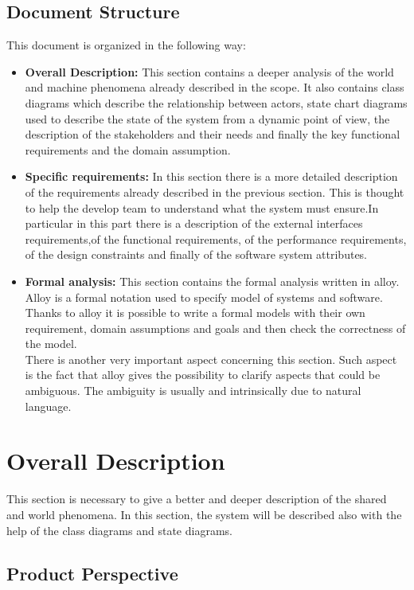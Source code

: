 \documentclass[titlepage]{article}
\begin{document}
\subsection{Document Structure}
This document is organized in the following way:
\begin{itemize}
	\item \textbf{Overall Description:} This section contains a deeper analysis of the world and machine phenomena already described in the scope. It also contains class diagrams which describe the relationship between actors, state chart diagrams used to describe the state of the system from a dynamic point of view, the description of the stakeholders and their needs and finally the key functional requirements and the domain assumption.
	
	\item \textbf{Specific requirements:} In this section there is a more detailed description of the requirements already described in the previous section. This is thought to help the develop team to understand what the system must ensure.In particular in this part there is a description of the external interfaces requirements,of the functional requirements, of the performance requirements, of the design constraints and finally of the software system attributes.
	
	\item \textbf{Formal analysis:} This section contains the formal analysis written in alloy. Alloy is a formal notation used to specify model of systems and software. Thanks to alloy it is possible to write a formal models with their own requirement, domain assumptions and goals and then check the correctness of the model.\\
There is another very important aspect concerning this section. Such aspect is the fact that alloy gives the possibility to clarify aspects that could be ambiguous. The ambiguity is usually and intrinsically due to natural language. 
\end{itemize}
\newpage

\section{Overall Description}
This section is necessary to give a better and deeper description of the shared and world phenomena. In this section, the system will be described also with the help of the class diagrams and state diagrams.
\subsection{Product Perspective}
\end{document}
